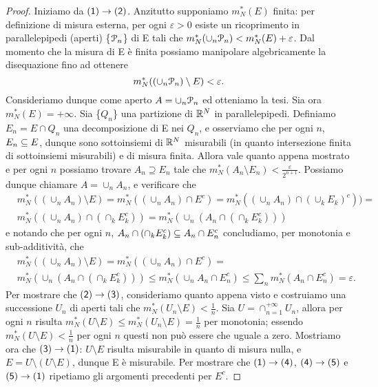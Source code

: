 \documentclass[Completo.tex]{subfiles}
\begin{document}
	\begin{proof}
		Iniziamo da $\sf[(1)] \ra \sf[(2)]$. Anzitutto supponiamo $m_N^{*}(E)$ finita: per definizione di misura esterna, per ogni $\varepsilon > 0$ esiste un ricoprimento in parallelepipedi (aperti) \{$\eu[P]_n$\} di E tali che $m_N^{*}(\cup_{n} \eu[P]_n) < m_N^{*}(E) + \varepsilon$. Dal momento che la misura di E è finita possiamo manipolare algebricamente la disequazione fino ad ottenere
		\begin{equation*}
		m_N^{*}((\cup_{n} \eu[P]_n) \setminus E) < \varepsilon.
		\end{equation*}
		Consideriamo dunque come aperto $A = \cup_{n} \eu[P]_n$ ed otteniamo la tesi. Sia ora $m_N^{*}(E) = +\infty$. Sia \{$Q_n$\} una partizione di $\bb[R]^{N}$ in parallelepipedi. Definiamo $E_n = E \cap Q_n$ una decomposizione di E nei $Q_n$, e osserviamo che per ogni $n$, $E_n \subseteq E$, dunque sono sottoinsiemi di $\bb[R]^{N}$ misurabili (in quanto intersezione finita di sottoinsiemi misurabili) e di misura finita. Allora vale quanto appena mostrato e per ogni $n$ possiamo trovare $A_n \supseteq E_n$ tale che $m_N^{*}(A_n \setminus E_n) < \frac{\varepsilon}{2^{n+1}}$. Possiamo dunque chiamare $A = \cup_{n} A_n$, e verificare che
		\begin{align*}
		& m_N^{*}((\cup_{n} A_n) \setminus E) = m_N^{*}((\cup_{n} A_n) \cap E^{c}) = m_N^{*}((\cup_{n} A_n) \cap (\cup_{k} E_k)^{c})) = \\
		& m_N^{*}((\cup_{n} A_n) \cap (\cap_{k} E_k^{c})) = m_N^{*}(\cup_{n} (A_n \cap (\cap_{k} E_k^{c})))
		\end{align*}
		e notando che per ogni $n$, $A_n \cap (\cap_{k} E_k^{c}) \subseteq A_n \cap E_n^{c}$ concludiamo, per monotonia e sub-additività, che
		\begin{align*}
		& m_N^{*}((\cup_{n} A_n) \setminus E) = m_N^{*}((\cup_{n} A_n) \cap E^{c}) = \\
		&m_N^{*}(\cup_{n} (A_n \cap (\cap_{k} E_k^{c}))) \leq m_N^{*}(\cup_{n} A_n \cap E_n^{c}) \leq \sum_{n} m_N^{*}(A_n \cap E_n^{c}) = \varepsilon.
		\end{align*}
		Per mostrare che $\sf[(2)] \ra \sf[(3)]$, consideriamo quanto appena visto e costruiamo una successione $U_n$ di aperti tali che $m_N^{*}(U_n \setminus E) < \frac{1}{n}$. Sia $U = \cap_{n=1}^{+\infty} U_n$, allora per ogni $n$ risulta $m_N^{*}(U \setminus E) \leq m_N^{*}(U_n \setminus E) = \frac{1}{n}$ per monotonia; essendo $m_N^{*}(U \setminus E) < \frac{1}{n}$ per ogni $n$ questi non può essere che uguale a zero. Mostriamo ora che $\sf[(3)] \ra \sf[(1)]$: $U \setminus E$ risulta misurabile in quanto di misura nulla, e $E = U \setminus (U \setminus E)$, dunque E è misurabile. Per mostrare che $\sf[(1)] \ra \sf[(4)]$, $\sf[(4)] \ra \sf[(5)]$ e $\sf[(5)] \ra \sf[(1)]$ ripetiamo gli argomenti precedenti per $E^{c}$.
	\end{proof}
\end{document}

